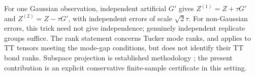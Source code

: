 For one Gaussian observation, independent artificial $G'$ gives
$Z^{(1)}=Z+\tau G'$ and $Z^{(2)}=Z-\tau G'$, with independent errors of scale $\sqrt2\tau$. For non-Gaussian errors, this trick need not give independence; genuinely independent replicate groups suffice. The rank statement concerns Tucker mode ranks, and applies to TT tensors meeting the mode-gap conditions, but does not identify their TT bond ranks. Subspace projection is established methodology \citep{xu2025}; the present contribution is an explicit conservative finite-sample certificate in this setting.
